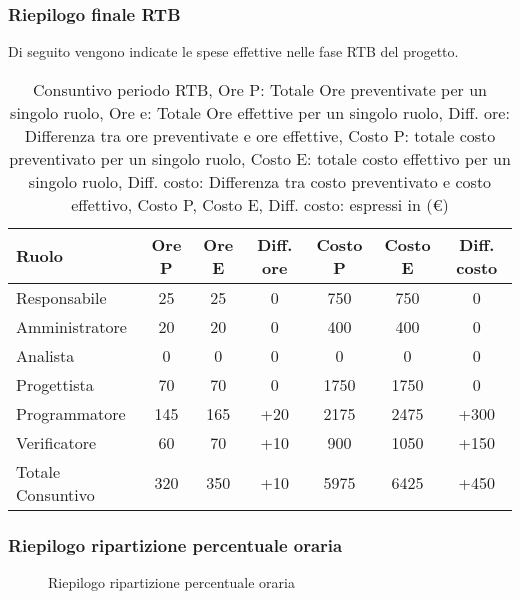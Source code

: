 \subsubsection{Riepilogo finale RTB}
Di seguito vengono indicate le spese effettive nelle fase RTB del progetto.
\begin{table}[H]
	\centering
	\begin{tabular}{l|c|c|c|c|c|c}
		\textbf{Ruolo}    & \textbf{Ore P} & \textbf{Ore E} & \textbf{Diff. ore} & \textbf{Costo P} & \textbf{Costo E} & \textbf{Diff. costo} \\
		\hline
		Responsabile      & 25             & 25             & 0                  & 750              & 750              & 0                    \\
		Amministratore    & 20             & 20             & 0                  & 400              & 400              & 0                    \\
		Analista          & 0              & 0              & 0                  & 0                & 0                & 0                    \\
		Progettista       & 70             & 70             & 0                  & 1750             & 1750             & 0                    \\
		Programmatore     & 145            & 165            & +20                & 2175             & 2475             & +300                 \\
		Verificatore      & 60             & 70             & +10                & 900              & 1050             & +150                 \\
		\hline
		Totale Consuntivo & 320            & 350            & +10                & 5975             & 6425             & +450                 \\
		\hline
	\end{tabular}
	\caption{Consuntivo periodo RTB, Ore P: Totale Ore preventivate per un singolo ruolo, Ore e: Totale Ore effettive per un singolo ruolo,
		Diff. ore: Differenza tra ore preventivate e ore effettive, Costo P: totale costo preventivato per un singolo ruolo,
		Costo E: totale costo effettivo per un singolo ruolo,  Diff. costo: Differenza tra costo preventivato e costo effettivo,
		Costo P, Costo E, Diff. costo: espressi in (\euro)}
\end{table}


\subsubsection{Riepilogo ripartizione percentuale oraria}
\begin{figure}[h]
	\centering
	\caption{Riepilogo ripartizione percentuale oraria}
\end{figure}

